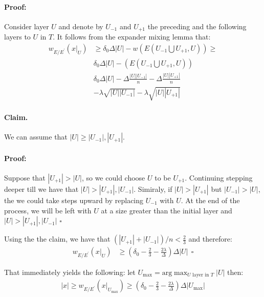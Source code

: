 \documentclass{article}
\begin{document}
\begin{multicols*}{2}
  \paragraph{Proof:} Consider layer $U$ and denote by $U_{-1}$ and $U_{+1}$ the preceding and the following layers to $U$ in $T$. It follows from the expander mixing lemma that:
  \begin{equation*}
    \begin{split}
      w_{E/E^{\prime}}\left( x|_{U} \right) & \ge \delta_{0}\Delta|U| -w\left( E(U_{-1} \bigcup U_{+1} ,U)  \right) \ge \\ 
      & \delta_{0}\Delta|U| -\left( E(U_{-1} \bigcup U_{+1} ,U)  \right) \\ 
      &  \delta_{0}\Delta|U| - \Delta\frac{|U||U_{-1}|}{n} - \Delta\frac{|U||U_{+1}|}{n} \\
      & -\lambda\sqrt{|U||U_{-1}|} - \lambda\sqrt{|U||U_{+1}|}
    \end{split}
  \end{equation*}

  \paragraph{Claim.} We can assume that $|U| \ge |U_{-1}|, |U_{+1}|$. 
  \paragraph{Proof:} Suppose that $|U_{+1}| > |U|$, so we could choose $U$ to be $U_{+1}$. Continuing stepping deeper till we have that $|U| > |U_{+1}|, |U_{-1}|$. Simiraly, if $|U| > |U_{+1}|$ but $|U_{-1}| > |U|$, the we could take steps upward by replacing $U_{-1}$ with $U$. At the end of the process, we will be left with $U$ at a size greater than the initial layer and $|U| > |U_{+1}|, |U_{-1}|$ $\square$

  Using the the claim, we have that $\left( |U_{+1}| + |U_{-1}| \right)/n <\frac{2}{3} $ and therefore:
  \begin{equation*}
    \begin{split}
      w_{E/E^{\prime}}\left( x|_{U} \right) & \ge \left( \delta_{0} - \frac{2}{3} - \frac{2\lambda}{\Delta} \right) \Delta |U| \ \  \square 
    \end{split}
  \end{equation*}

  That immediately yields the following: let $U_{\text{max}} = \text{arg} \max_{U \text{ layer in }  T } |U|  $  then: 
  \begin{equation*}
    \begin{split}
      |x| \ge  w_{E/E^{\prime}}\left( x|_{U_{\text{max}}} \right) \ge \left( \delta_{0} - \frac{2}{3} - \frac{2\lambda}{\Delta} \right)\Delta |U_{\text{max}}|
    \end{split}
  \end{equation*}

\end{multicols*}
\end{document}
